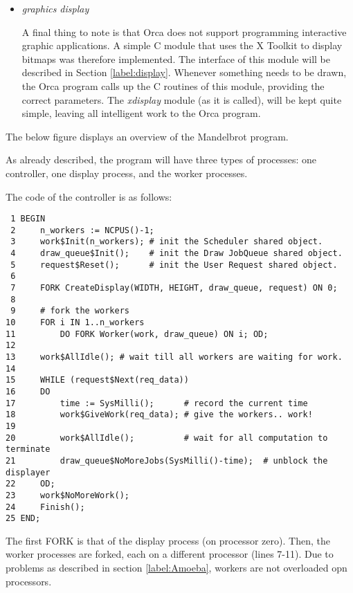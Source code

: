 \begin{itemize}
\item {\em graphics display}

A final thing to note is that Orca does not support programming interactive
graphic applications. A simple C module that uses the X Toolkit to display
bitmaps was therefore implemented. The interface of this module
will be described in Section \ref{label:display}. 
Whenever something needs to be drawn, the Orca program calls up the C routines
of this module, providing the correct parameters. The {\em xdisplay} module
(as it is called), will be kept quite simple, leaving all intelligent
work to the Orca program.
\end{itemize}
\Skip
The below figure displays an overview of the Mandelbrot program.

\clearpage




As already described, the program will have three types of processes: one 
controller, one display process, and the worker processes.

The code of the controller is as follows:
\begin{verbatim}
 1 BEGIN
 2     n_workers := NCPUS()-1;
 3     work$Init(n_workers); # init the Scheduler shared object.
 4     draw_queue$Init();    # init the Draw JobQueue shared object.
 5     request$Reset();      # init the User Request shared object.
 6
 7     FORK CreateDisplay(WIDTH, HEIGHT, draw_queue, request) ON 0;
 8
 9     # fork the workers 
10     FOR i IN 1..n_workers
11         DO FORK Worker(work, draw_queue) ON i; OD;
12
13     work$AllIdle(); # wait till all workers are waiting for work.
14
15     WHILE (request$Next(req_data))
16     DO
17         time := SysMilli();      # record the current time
18         work$GiveWork(req_data); # give the workers.. work! 
19
20         work$AllIdle();          # wait for all computation to terminate
21         draw_queue$NoMoreJobs(SysMilli()-time);  # unblock the displayer
22     OD;
23     work$NoMoreWork();
24     Finish();
25 END;
\end{verbatim}

The first FORK is that of the display process (on processor zero). Then,
the worker processes are forked, each on a different processor (lines 7-11).
Due to problems as described in section \ref{label:Amoeba}, workers
are not overloaded opn processors.


